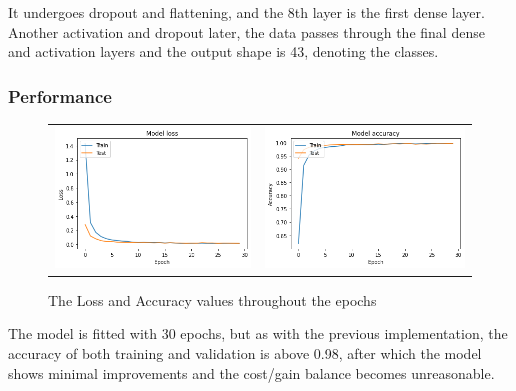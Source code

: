 \documentclass[12pt, landscape]{article}
\begin{document}
\begin{multicols}{3}
It undergoes dropout and flattening, and the 8th layer is the first dense layer.
Another activation and dropout later, the data passes through the final dense
and activation layers and the output shape is 43, denoting the classes.

\subsubsection{Performance}
\begin{figure}[H]
    \centering
    \begin{tabular}{cc}
    \includegraphics[scale=0.45]{Kresult1.png}&
    \includegraphics[scale=0.45]{Kresult.png}\\
    \end{tabular}
    \caption{The Loss and Accuracy values throughout the epochs}
    \label{fig1:acc}
\end{figure}
The model is fitted with 30 epochs, but as with the previous implementation, the
accuracy of both training and validation is above 0.98, after which the model
shows minimal improvements and the cost/gain balance becomes unreasonable.


\end{multicols}
\end{document}
